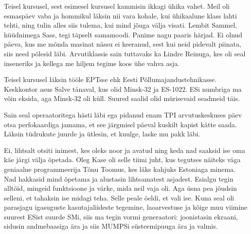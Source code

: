 
Teisel kursusel, sest esimesel kursusel kammisin ikkagi ühika vahet. Meil oli esmaspäev vaba ja hommikul 
läksin nii vara kohale, kui ühikaalune klass lahti tehti, ning tulin alles siis tulema, kui mind jõuga 
välja visati. Lembit Sammel, hüüdnimega Sass, tegi täpselt samamoodi. 
Panime nagu paaris härjad. Ei olnud päeva, kus me mõnda masinat nässu ei 
keeranud, sest kui neid pidevalt piinata, siis need põlesid läbi. Arvutiklassis sain tuttavaks ka Lindre Reinuga, kes oli 
seal inseneriks ja kellega me hiljem tegime koos ühe vahva asja. 

Teisel kursusel läksin tööle EPTsse ehk Eesti 
Põllumajandustehnikasse. Keskkontor asus Salve 
tänaval, kus olid Minsk-32 ja 
ES-1022. ESi numbriga ma võin eksida, aga 
Minsk-32 oli küll. Suured saalid olid mürisevaid seadmeid täis. 

Sain seal operaatoritega hästi läbi ega pidanud enam TPI arvutuskeskuses päev otsa perfokaardiga jamama, et see 
järgmisel päeval kuskilt kapist kätte saada. Läksin tüdrukute 
juurde ja ütlesin, et kuulge, laske mu pakk läbi. 


Ei, lihtsalt otsiti inimest, kes oleks noor ja avatud ning keda nad saaksid ise
oma käe järgi välja õpetada. Oleg Kase oli selle tiimi 
juht, kus tegutses näiteks väga geniaalne programmeerija Tõnu Toomus, kes läks kahjuks 
Estoniaga minema. Nad 
hakkasid mind õpetama ja alustasin lihtsamatest asjadest. Esialgu tegin
alltöid, mingeid funktsioone ja värke, mida neil vaja oli. Aga üsna pea 
jõudsin selleni, et tahaksin ise midagi teha. Selle peale öeldi, et vali 
ise. Kuna seal oli parasjagu igasuguste 
kasutajaliideste tegemine, laoarvestuse ja kõige muu viimine suurest ESist suurde 
SMi, siis ma tegin vormi 
generaatori: joonistasin ekraani, sidusin andmebaasiga ära ja siis
MUMPSi süsteemipuuga ära ja valmis.

